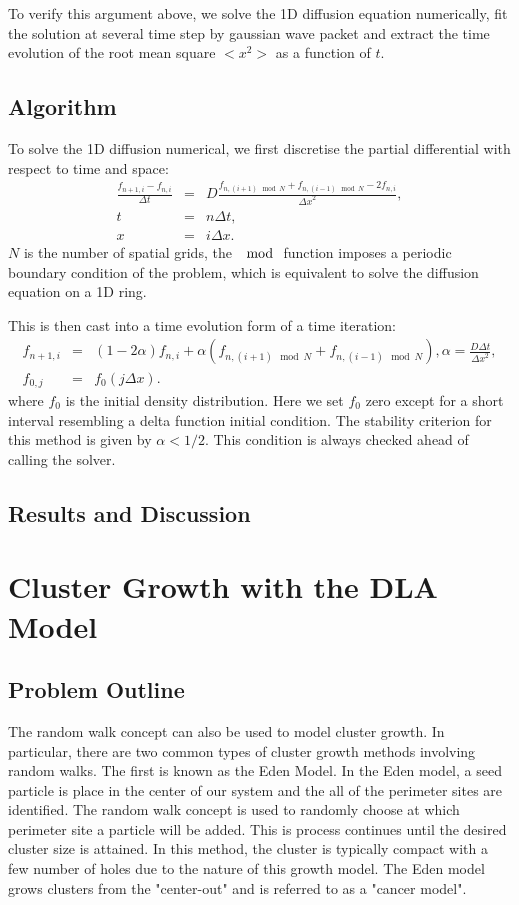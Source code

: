 \documentclass[a4paper,12pt]{article}
\begin{document}
To verify this argument above, we solve the 1D diffusion equation numerically, fit the solution at several time step by gaussian wave packet and extract the time evolution of the root mean square $<x^2>$ as a function of $t$.

\subsection{Algorithm}
To solve the 1D diffusion numerical, we first discretise the partial differential with respect to time and space:
\begin{eqnarray*}
\frac{f_{n+1,i}-f_{n,i}}{\Delta t}  &=& D\frac{f_{n,(i+1)\mod N}+f_{n,(i-1)\mod N} - 2 f_{n,i}}{{\Delta x}^2},\\
t &=& n \Delta t, \\
x &=& i \Delta x.
\end{eqnarray*}
$N$ is the number of spatial grids, the $\mod$ function imposes a periodic boundary condition of the problem, which is equivalent to solve the diffusion equation on a 1D ring.

This is then cast into a time evolution form of a time iteration:
\begin{eqnarray*}
f_{n+1,i} &=&  (1 - 2 \alpha) f_{n,i} + \alpha (f_{n, (i+1)\mod N}+f_{n, (i-1)\mod N}), \alpha = \frac{D\Delta t}{{\Delta x}^2},\\
f_{0,j} &=& f_0(j\Delta x).
\end{eqnarray*}
where $f_0$ is the initial density distribution. Here we set $f_0$ zero except for a short interval resembling a delta function initial condition. The stability criterion for this method is given by $\alpha < 1/2$. This condition is always checked ahead of calling the solver. 

\subsection{Results and Discussion}


\section{Cluster Growth with the DLA Model}
\subsection{Problem Outline}
\indent
\indent The random walk concept can also be used to model cluster growth.  In particular, there are two common types of cluster growth methods involving random walks.
The first is known as the Eden Model.  In the Eden model, a seed particle is place in the center of our system and the all of the perimeter sites are identified.  The 
random walk concept is used to randomly choose at which perimeter site a particle will be added.  This is process continues until the desired cluster size is attained.
In this method, the cluster is typically compact with a few number of holes due to the nature of this growth model.  The Eden model grows clusters from the "center-out" 
and is referred to as a "cancer model". 
\end{document}
